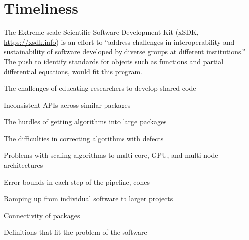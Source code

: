 \documentclass{amsart}
\begin{document}
\section{Timeliness} %

The Extreme-scale Scientific Software Development Kit (xSDK, \url{https://xsdk.info}) is an effort to ``address challenges in interoperability and sustainability of software developed by diverse groups at different institutions.'' The push to identify standards for objects such as functions and partial differential equations, would fit this program.




The challenges of educating researchers to develop shared code

Inconsistent APIs across similar packages

The hurdles of getting algorithms into large packages

The difficulties in correcting algorithms with defects

Problems with scaling algorithms to multi-core, GPU, and multi-node architectures



Error bounds in each step of the pipeline, cones

Ramping up from individual software to larger projects

Connectivity of packages

Definitions that fit the problem of the software 
\end{document}
